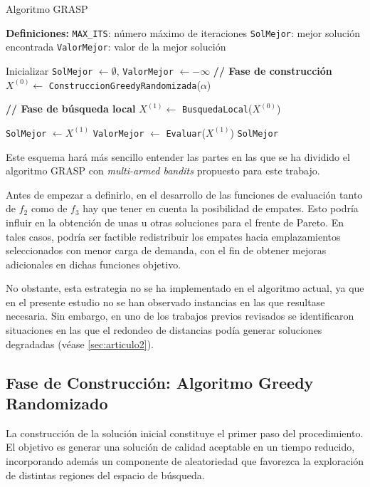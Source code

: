 \documentclass[12pt,a4paper]{book}
\begin{document}
\begin{algorithm}[H]
\caption{Algoritmo GRASP}
\begin{algorithmic}[1]
\Statex \textbf{Definiciones:}
\Statex \hspace{1em} \texttt{MAX\_ITS}: número máximo de iteraciones
\Statex \hspace{1em} \texttt{SolMejor}: mejor solución encontrada
\Statex \hspace{1em} \texttt{ValorMejor}: valor de la mejor solución

\Statex

\State Inicializar \texttt{SolMejor} $\gets \emptyset$, \texttt{ValorMejor} $\gets -\infty$
    \Statex \textbf{// Fase de construcción}
    \State $X^{(0)}\gets$ \texttt{ConstruccionGreedyRandomizada}($\alpha$)
    
    \Statex \textbf{// Fase de búsqueda local}
    \State $X^{(1)}\gets$ \texttt{BusquedaLocal}($X^{(0)}$)

        \State \texttt{SolMejor} $\gets X^{(1)}$
        \State \texttt{ValorMejor} $\gets$ \texttt{Evaluar}($X^{(1)}$)
    \EndIf
\EndFor
\State \Return \texttt{SolMejor}


\end{algorithmic}
\end{algorithm}

Este esquema hará más sencillo entender las partes en las que se ha dividido el algoritmo GRASP con \textit{multi-armed bandits} propuesto para este trabajo.

Antes de empezar a definirlo, en el desarrollo de las funciones de evaluación tanto de $f_2$ como de $f_3$ hay que tener en cuenta la posibilidad de empates. Esto podría influir en la obtención de unas u otras soluciones para el frente de Pareto. 
En tales casos, podría ser factible redistribuir los empates hacia emplazamientos seleccionados con menor carga de demanda, con el fin de obtener mejoras adicionales en dichas funciones objetivo.  

No obstante, esta estrategia no se ha implementado en el algoritmo actual, ya que en el presente estudio no se han observado instancias en las que resultase necesaria. Sin embargo, en uno de los trabajos previos revisados se identificaron situaciones en las que el redondeo de distancias podía generar soluciones degradadas (véase \ref{sec:articulo2}).  

\subsection{Fase de Construcción: Algoritmo Greedy Randomizado}
La construcción de la solución inicial constituye el primer paso del procedimiento. El objetivo es generar una solución de calidad aceptable en un tiempo reducido, incorporando además un componente de aleatoriedad que favorezca la exploración de distintas regiones del espacio de búsqueda.  
\end{document}
